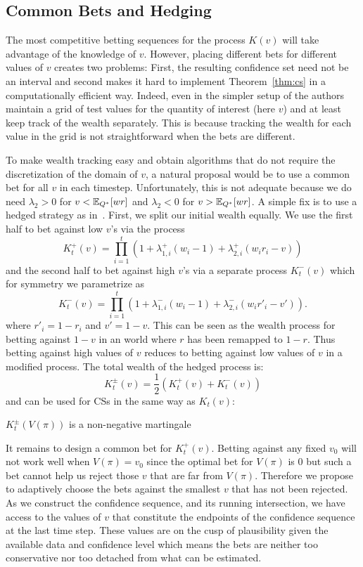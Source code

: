\subsection{Common Bets and Hedging}
\label{sec:hedged}
The most competitive betting sequences for the process
$K(v)$ will take advantage 
of the knowledge of $v$. However, placing different
bets for different values of $v$ creates two problems:
First, the resulting confidence set need not be an 
interval and second makes it hard 
to implement Theorem~\ref{thm:cs} 
in a computationally efficient way.
Indeed, even in the simpler setup of
\cite{waudby-smith_variance-adaptive_2020}
the authors maintain a grid of test values 
for the quantity of interest (here $v$)  
and at least keep track of the wealth separately.
This is because tracking the wealth for each
value in the grid is not straightforward when
the bets are different. 

To make wealth tracking easy and
obtain algorithms that do not require the 
discretization of the domain of $v$, a natural
proposal would be to use a common bet for 
all $v$ in each timestep. Unfortunately, 
this is not adequate because we do need 
$\lambda_2 > 0$ for $v<\mathbb{E}_{Q^*}[wr]$ 
and $\lambda_2 < 0$ for $v>\mathbb{E}_{Q^*}[wr]$. 
A simple fix is to use a hedged 
strategy as in~\cite{waudby-smith_variance-adaptive_2020}.
First, we split our initial wealth equally.
We use the first half to bet against low $v$'s
via the process
\[
K_t^{+}(v) = \prod_{i=1}^t \left(1+\lambda_{1,i}^{+}(w_i-1)+\lambda_{2,i}^{+}(w_i r_i -v)\right)
\]
and the second half to bet against high $v$'s
via a separate process $K_t^{-}(v)$ which 
for symmetry we parametrize as
\[
K_t^{-}(v) = \prod_{i=1}^t \left(1+\lambda_{1,i}^{-}(w_i-1)+\lambda_{2,i}^{-}(w_i r'_i -v')\right).
\]
where $r'_i=1-r_i$ and $v'=1-v$.
This can be seen as the wealth process for betting against $1-v$ 
in an world where $r$ has been remapped to $1-r$. 
Thus betting against high values of $v$ 
reduces to betting against low values of $v$ in a
modified process. The total wealth of the hedged process is:
\begin{equation}
K_t^{\pm}(v) = \frac{1}{2} (K_t^{+}(v) + K_t^{-}(v))
\label{eq:hedged}
\end{equation}
and can be used for CSs in the same way as $K_t(v)$:
\begin{theorem}
\label{thm:martingale-1d}
$K_t^{\pm}(V(\pi))$ is a non-negative martingale
\end{theorem}

It remains to design a common bet
for $K_t^{+}(v)$.
Betting against any fixed $v_0$ 
will not work well when $V(\pi)=v_0$
since the optimal bet for $V(\pi)$ is 0 but
such a bet cannot help us reject those $v$ that are far from
$V(\pi)$. Therefore we propose to adaptively choose
the bets against the smallest $v$ 
that has not been rejected. As we 
construct the confidence sequence, and its running 
intersection, we have access to the values of $v$
that constitute the endpoints of the confidence sequence
at the last time step. These values are on the cusp of
plausibility given the available data and confidence level
which means the bets are neither too conservative nor 
too detached from what can be estimated.

